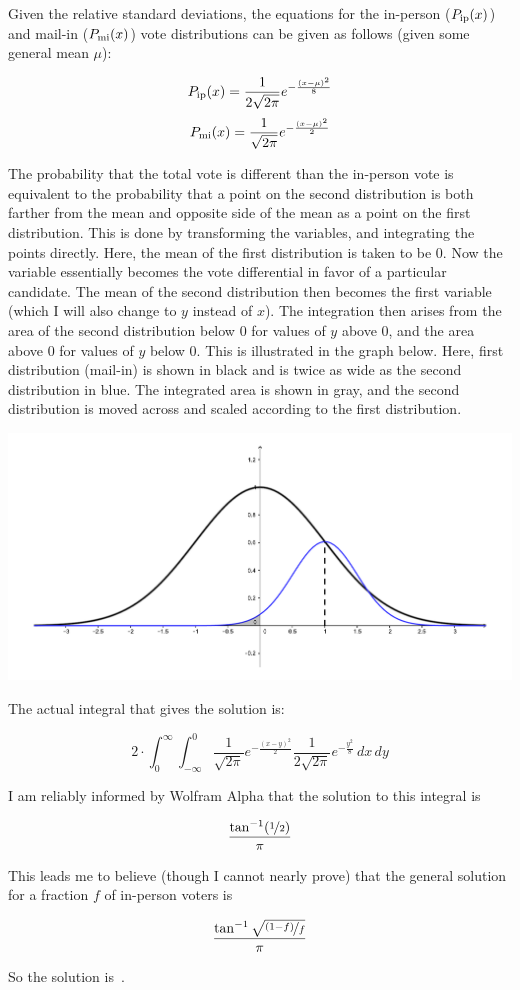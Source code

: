 \documentclass{article}
\begin{document}
Given the relative standard deviations, the equations for the in-person ($P_{\rm{ip}}(x)$) and mail-in ($P_{\rm{mi}}(x)$) vote distributions can be given as follows (given some general mean $\mu$):

\[
P_{\rm{ip}}(x)=\frac{1}{2\sqrt{2\pi}}e^{-\frac{(x-\mu)^{2}}{8}}
\]
\[
P_{\rm{mi}}(x)=\frac{1}{\sqrt{2\pi}}e^{-\frac{(x-\mu)^{2}}{2}}
\]

The probability that the total vote is different than the in-person vote is equivalent to the probability that a point on the second distribution is both farther from the mean and opposite side of the mean as a point on the first distribution.
This is done by transforming the variables, and integrating the points directly.
Here, the mean of the first distribution is taken to be 0.
Now the variable essentially becomes the vote differential in favor of a particular candidate.
The mean of the second distribution then becomes the first variable (which I will also change to $y$ instead of $x$).
The integration then arises from the area of the second distribution below 0 for values of $y$ above 0, and the area above 0 for values of $y$ below 0.
This is illustrated in the graph below.
Here, first distribution (mail-in) is shown in black and is twice as wide as the second distribution in blue.
The integrated area is shown in gray, and the second distribution is moved across and scaled according to the first distribution.

\vspace{0.1in}
\begin{center}
\includegraphics[width=6in]{graph.pdf}
\end{center}
\vspace{0.1in}

The actual integral that gives the solution is:

\[
2\cdot\int_{0}^{\infty}\int_{-\infty}^{0}\frac{1}{\sqrt{2\pi}}e^{-\frac{(x-y)^{2}}{2}}\frac{1}{2\sqrt{2\pi}}e^{-\frac{y^{2}}{8}}\,dx\,dy
\]

I am reliably informed by Wolfram Alpha that the solution to this integral is

\[
\frac{\tan^{-1}(\nicefrac{1}{2})}{\pi}
\]

This leads me to believe (though I cannot nearly prove) that the general solution for a fraction $f$ of in-person voters is

\[
\frac{\tan^{-1}\sqrt{\nicefrac{(1-f)}{f}}}{\pi}
\]

So the solution is
\,.
\end{document}
